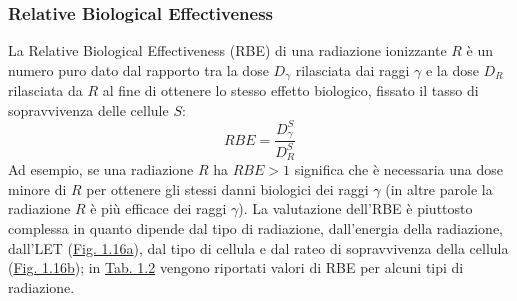 \documentclass[12pt,a4paper,twoside]{report}
\begin{document}
	\subsubsection{Relative Biological Effectiveness}\label{par:rbe}
	La Relative Biological Effectiveness (RBE) di una radiazione ionizzante $R$ è un numero puro dato dal rapporto tra la dose $D_\gamma$ rilasciata dai raggi $\gamma$ e la dose $D_R$ rilasciata da $R$ al fine di ottenere lo stesso effetto biologico, fissato il tasso di sopravvivenza delle cellule $S$:
	\begin{equation}
		RBE=\frac{D^S_\gamma}{D^S_R}
		\label{eq:rbe}
	\end{equation}
	Ad esempio, se una radiazione $R$ ha $RBE>1$ significa che è necessaria una dose minore di $R$ per ottenere gli stessi danni biologici dei raggi $\gamma$ (in altre parole la radiazione $R$ è più efficace dei raggi $\gamma$). La valutazione dell'RBE è piuttosto complessa in quanto dipende dal tipo di radiazione, dall'energia della radiazione, dall'LET (\hyperref[fig:let_rbe]{Fig. 1.16a}), dal tipo di cellula e dal rateo di sopravvivenza della cellula (\hyperref[fig:survival_dose]{Fig. 1.16b}); in \hyperref[tab:let_rbe]{Tab. 1.2} vengono riportati valori di RBE per alcuni tipi di radiazione.
	
\end{document}
